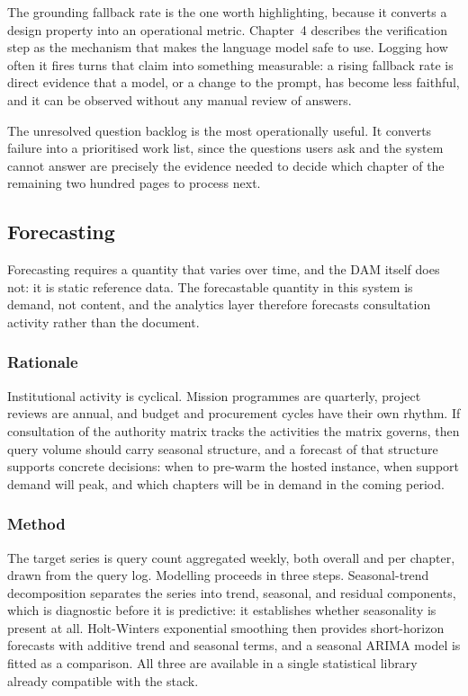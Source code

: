 The grounding fallback rate is the one worth highlighting, because it converts a design property into an operational metric. Chapter~4 describes the verification step as the mechanism that makes the language model safe to use. Logging how often it fires turns that claim into something measurable: a rising fallback rate is direct evidence that a model, or a change to the prompt, has become less faithful, and it can be observed without any manual review of answers.

The unresolved question backlog is the most operationally useful. It converts failure into a prioritised work list, since the questions users ask and the system cannot answer are precisely the evidence needed to decide which chapter of the remaining two hundred pages to process next.

\subsection{Forecasting}
\label{sec:forecast}

Forecasting requires a quantity that varies over time, and the DAM itself does not: it is static reference data. The forecastable quantity in this system is demand, not content, and the analytics layer therefore forecasts consultation activity rather than the document.

\subsubsection{Rationale}

Institutional activity is cyclical. Mission programmes are quarterly, project reviews are annual, and budget and procurement cycles have their own rhythm. If consultation of the authority matrix tracks the activities the matrix governs, then query volume should carry seasonal structure, and a forecast of that structure supports concrete decisions: when to pre-warm the hosted instance, when support demand will peak, and which chapters will be in demand in the coming period.

\subsubsection{Method}

The target series is query count aggregated weekly, both overall and per chapter, drawn from the query log. Modelling proceeds in three steps. Seasonal-trend decomposition separates the series into trend, seasonal, and residual components, which is diagnostic before it is predictive: it establishes whether seasonality is present at all. Holt-Winters exponential smoothing then provides short-horizon forecasts with additive trend and seasonal terms, and a seasonal ARIMA model is fitted as a comparison. All three are available in a single statistical library already compatible with the stack.

